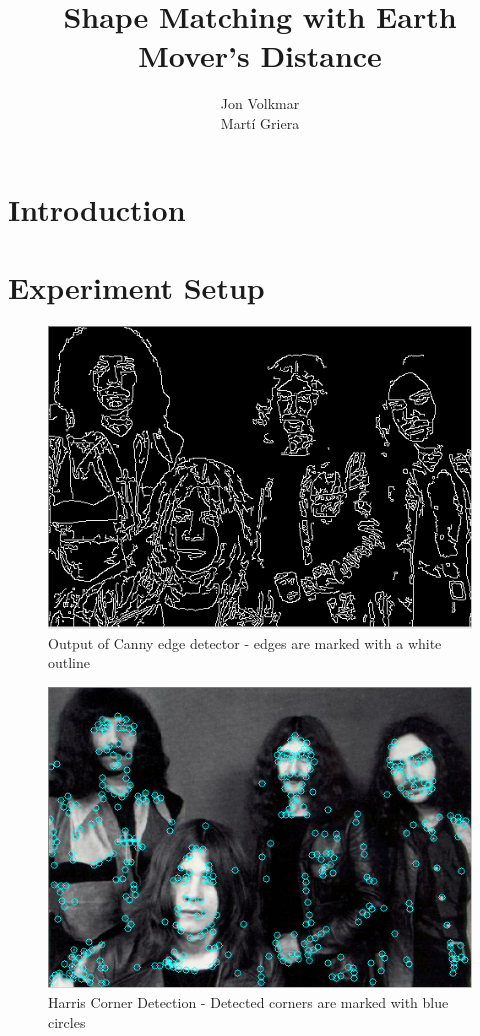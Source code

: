 \documentclass[10pt,a4paper]{article}
\title{\textbf{Shape Matching with Earth Mover's Distance}}
\author{Jon Volkmar\\
		Mart\'{i} Griera}
\date{}
\begin{document}
\maketitle

\section{Introduction}

\section{Experiment Setup}

\begin{figure}[ht!]
\centering
\includegraphics{canny_edge.png}
\caption{Output of Canny edge detector - edges are marked with a white outline}
\label{overflow}
\end{figure}

\begin{figure}[ht!]
\centering
\includegraphics{harris_corner.png}
\caption{Harris Corner Detection - Detected corners are marked with blue circles}
\label{overflow}
\end{figure}
\end{document}
